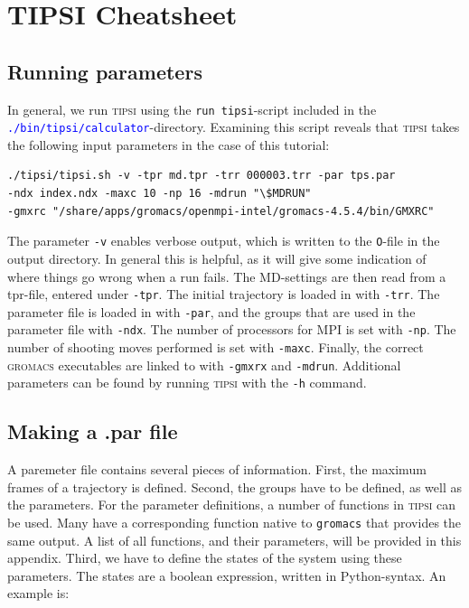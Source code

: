\documentclass[]{article}
\begin{document}
\newpage
\section*{TIPSI Cheatsheet}

\subsection*{Running parameters}

In general, we run \textsc{tipsi} using the \texttt{run tipsi}-script included in the \textcolor{blue}{\texttt{./bin/tipsi/calculator}}-directory. 
Examining this script reveals that \textsc{tipsi} takes the following input parameters in the case of this tutorial:

\begin{lstlisting}
./tipsi/tipsi.sh -v -tpr md.tpr -trr 000003.trr -par tps.par 
-ndx index.ndx -maxc 10 -np 16 -mdrun "\$MDRUN"
-gmxrc "/share/apps/gromacs/openmpi-intel/gromacs-4.5.4/bin/GMXRC" 
\end{lstlisting}

The parameter \texttt{-v} enables verbose output, which is written to the \texttt{O}-file in the output directory. 
In general this is helpful, as it will give some indication of where things go wrong when a run fails. 
The MD-settings are then read from a tpr-file, entered under \texttt{-tpr}. 
The initial trajectory is loaded in with \texttt{-trr}. 
The parameter file is loaded in with \texttt{-par}, and the groups that are used in the parameter file with \texttt{-ndx}. 
The number of processors for MPI is set with \texttt{-np}. 
The number of shooting moves performed is set with \texttt{-maxc}.
Finally, the correct \textsc{gromacs} executables are linked to with \texttt{-gmxrx} and \texttt{-mdrun}.
Additional parameters can be found by running \textsc{tipsi} with the \texttt{-h} command.

\subsection*{Making a .par file}

A paremeter file contains several pieces of information. First, the maximum frames of a trajectory is defined. 
Second, the groups have to be defined, as well as the parameters. 
For the parameter definitions, a number of functions in \textsc{tipsi} can be used. 
Many have a corresponding function native to \texttt{gromacs} that provides the same output. 
A list of all functions, and their parameters, will be provided in this appendix. 
Third, we have to define the states of the system using these parameters.
The states are a boolean expression, written in Python-syntax. An example is:
\end{document}
